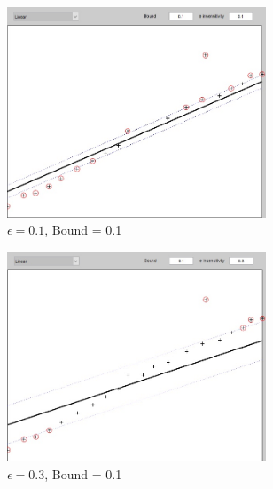 \begin{figure}[ht]
	\centering
	\begin{subfigure}[b]{0.3\textwidth}
		\centering
		\includegraphics[width = 0.85\textwidth]{Exercise2/Report/Ex2.1_E=0.1_B=0.1}
		\caption{$\epsilon = 0.1$, Bound = 0.1 }\label{fig:lin_E=0.1_B=0.1}
	\end{subfigure}%
	\begin{subfigure}[b]{0.3\textwidth}
		\centering
		\includegraphics[width = 0.85\textwidth]{Exercise2/Report/Ex2.1_E=0.3_B=0.1}
		\caption{$\epsilon = 0.3$, Bound = 0.1 }\label{fig:lin_E=0.3_B=0.1}
	\end{subfigure}%
	\begin{subfigure}[b]{0.3\textwidth}
		\centering

\end{subfigure}
\end{figure}

